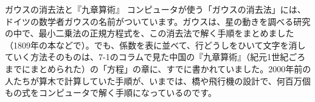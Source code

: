 \begin{kotoba}
\small
{}
\end{kotoba}


\begin{column}{ガウスの消去法と『九章算術』}
コンピュータが使う「ガウスの消去法」には、ドイツの数学者ガウスの名前がついています。ガウスは、星の動きを調べる研究の中で、最小二乗法の正規方程式を、この消去法で解く手順をまとめました（1809年の本などで）。でも、係数を表に並べて、行どうしをひいて文字を消していく方法そのものは、7-1のコラムで見た中国の『九章算術』（紀元1世紀ごろまでにまとめられた）の「方程」の章に、すでに書かれていました。2000年前の人たちが算木で計算していた手順が、いまでは、橋や飛行機の設計で、何百万個もの式をコンピュータで解く手順になっているのです。
\end{column}


